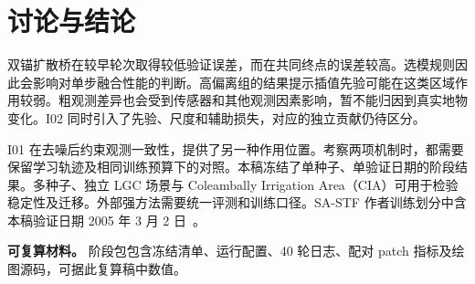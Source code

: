 \documentclass{article}
\begin{document}
\section{讨论与结论}
双锚扩散桥在较早轮次取得较低验证误差，而在共同终点的误差较高。选模规则因此会影响对单步融合性能的判断。高偏离组的结果提示插值先验可能在这类区域作用较弱。粗观测差异也会受到传感器和其他观测因素影响，暂不能归因到真实地物变化。I02 同时引入了先验、尺度和辅助损失，对应的独立贡献仍待区分。

I01 在去噪后约束观测一致性，提供了另一种作用位置。考察两项机制时，都需要保留学习轨迹及相同训练预算下的对照。本稿冻结了单种子、单验证日期的阶段结果。多种子、独立 LGC 场景与 Coleambally Irrigation Area（CIA）可用于检验稳定性及迁移。外部强方法需要统一评测和训练口径。SA-STF 作者训练划分中含本稿验证日期 2005 年 3 月 2 日~\cite{zhang2026sastf}。

\textbf{可复算材料。} 阶段包包含冻结清单、运行配置、40 轮日志、配对 patch 指标及绘图源码，可据此复算稿中数值。



\end{document}
